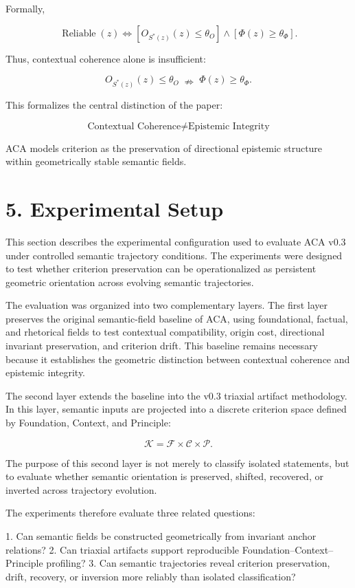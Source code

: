 \documentclass[11pt]{article}
\begin{document}
Formally,

$$
\operatorname{Reliable}(z)
\iff
\left[
O_{S^{*}(z)}(z)\leq\theta_O
\right]
\wedge
\left[
\Phi(z)\geq\theta_\Phi
\right].
$$

Thus, contextual coherence alone is insufficient:

$$
O_{S^{*}(z)}(z)\leq\theta_O
\;\nRightarrow\;
\Phi(z)\geq\theta_\Phi.
$$

This formalizes the central distinction of the paper:

$$
\boxed{
\text{Contextual Coherence}
\neq
\text{Epistemic Integrity}
}
$$

ACA models criterion as the preservation of directional epistemic structure within geometrically stable semantic fields.

\section{5. Experimental Setup}

This section describes the experimental configuration used to evaluate ACA v0.3 under controlled semantic trajectory conditions. The experiments were designed to test whether criterion preservation can be operationalized as persistent geometric orientation across evolving semantic trajectories.

The evaluation was organized into two complementary layers. The first layer preserves the original semantic-field baseline of ACA, using foundational, factual, and rhetorical fields to test contextual compatibility, origin cost, directional invariant preservation, and criterion drift. This baseline remains necessary because it establishes the geometric distinction between contextual coherence and epistemic integrity.

The second layer extends the baseline into the v0.3 triaxial artifact methodology. In this layer, semantic inputs are projected into a discrete criterion space defined by Foundation, Context, and Principle:

$$
\mathcal{K}=\mathcal{F}\times\mathcal{C}\times\mathcal{P}.
$$

The purpose of this second layer is not merely to classify isolated statements, but to evaluate whether semantic orientation is preserved, shifted, recovered, or inverted across trajectory evolution.

The experiments therefore evaluate three related questions:

1. Can semantic fields be constructed geometrically from invariant anchor relations?
2. Can triaxial artifacts support reproducible Foundation--Context--Principle profiling?
3. Can semantic trajectories reveal criterion preservation, drift, recovery, or inversion more reliably than isolated classification?
\end{document}

